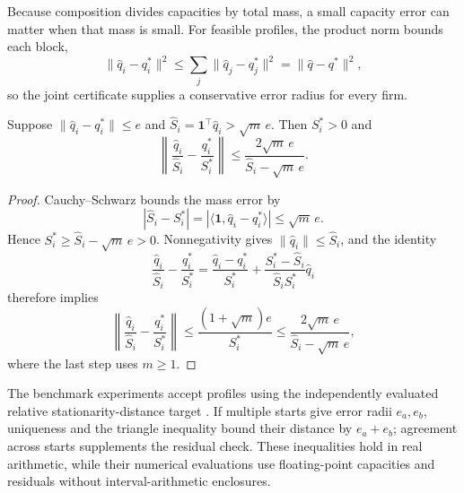 Because composition divides capacities by total mass, a small capacity error
can matter when that mass is small.
For feasible profiles, the product norm bounds each block,
\begin{equation}\label{eq:app-block-bound}
  \|\widehat q_i-q_i^*\|^2\leq\sum_j\|\widehat q_j-q_j^*\|^2
  =\|\widehat q-q^*\|^2,
\end{equation}
so the joint certificate supplies a conservative error radius for every firm.

\begin{proposition}\label{prop:normalization}
  Suppose $\|\widehat q_i-q_i^*\|\leq e$ and
  $\widehat S_i=\mathbf1^\top\widehat q_i>\sqrt m\,e$.
  Then $S_i^*>0$ and
  \begin{equation}\label{eq:normalization-bound}
    \left\|\frac{\widehat q_i}{\widehat S_i}-\frac{q_i^*}{S_i^*}\right\|
    \leq\frac{2\sqrt m\,e}{\widehat S_i-\sqrt m\,e}.
  \end{equation}
\end{proposition}

\begin{proof}
  Cauchy--Schwarz bounds the mass error by
  \begin{equation}\label{eq:app-mass-error}
    |\widehat S_i-S_i^*|
    =|\langle\mathbf1,\widehat q_i-q_i^*\rangle|\leq\sqrt m\,e.
  \end{equation}
  Hence $S_i^*\geq\widehat S_i-\sqrt m\,e>0$.
  Nonnegativity gives $\|\widehat q_i\|\leq\widehat S_i$, and the identity
  \begin{equation}\label{eq:app-normalization-split}
    \frac{\widehat q_i}{\widehat S_i}-\frac{q_i^*}{S_i^*}
    =\frac{\widehat q_i-q_i^*}{S_i^*}
    +\frac{S_i^*-\widehat S_i}{\widehat S_i S_i^*}\widehat q_i
  \end{equation}
  therefore implies
  \begin{equation}\label{eq:app-normalization-chain}
    \left\|\frac{\widehat q_i}{\widehat S_i}-\frac{q_i^*}{S_i^*}\right\|
    \leq\frac{(1+\sqrt m)e}{S_i^*}
    \leq\frac{2\sqrt m\,e}{\widehat S_i-\sqrt m\,e},
  \end{equation}
  where the last step uses $m\geq1$.
\end{proof}

The benchmark experiments accept profiles using the independently evaluated
relative stationarity-distance target .
If multiple starts give error radii $e_a,e_b$, uniqueness and the triangle
inequality bound their distance by $e_a+e_b$; agreement across starts
supplements the residual check.
These inequalities hold in real arithmetic, while their numerical evaluations
use floating-point capacities and residuals without interval-arithmetic
enclosures.
